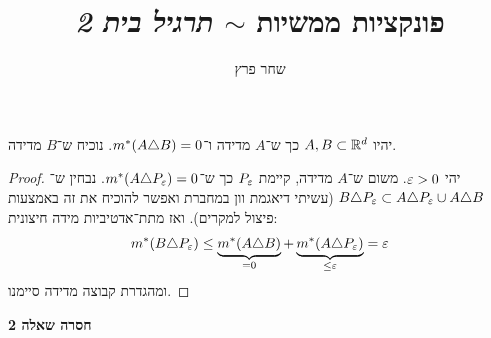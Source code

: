\documentclass[]{../../../../tex/classes/homework}
\author{שחר פרץ}
\title{פונקציות ממשיות $\sim$ \textit{תרגיל בית 2}}
\begin{document}
	\maketitle
	\section{}
	יהיו $A, B \subset \mathbb{R}^{d}$ כך ש־$A$ מדידה ו־$m^*(A \triangle B) = 0$. נוכיח ש־$B$ מדידה. 
	
	\begin{proof}
		יהי $\eg > 0$. משום ש־$A$ מדידה, קיימת $P_\eg$ כך ש־$m^*(A \trio P_\eg) = 0$. נבחין ש־$B \trio P_\eg \subset A \trio P_\eg \cup A \trio B$ (עשיתי דיאגמת וון במחברת ואפשר להוכיח את זה באמצעות פיצול למקרים). ואז מתת־אדטיביות מידה חיצונית: 
		\[ m^*(B \trio P_\eg) \le \underbrace{m^*(A \trio B)}_{ = 0} + \underbrace{m^*(A \trio P_\eg)}_{\le \eg} = \eg \]
		ומהגדרת קבוצה מדידה סיימנו. 
	\end{proof}
	\textbf{חסרה שאלה 2}
	
%	
	
\end{document}
